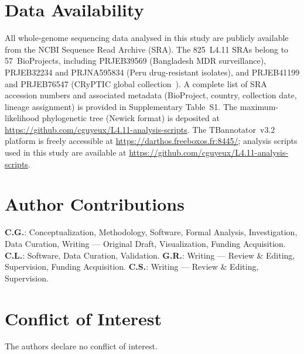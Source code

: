 \documentclass[11pt,a4paper]{article}
\newcommand{\lignee}[1]{\textsf{#1}}
\begin{document}
\section*{Data Availability}

All whole-genome sequencing data analysed in this study are publicly available
from the NCBI Sequence Read Archive (SRA).  The 825~\lignee{L4.11} SRAs
belong to 57~BioProjects, including PRJEB39569 (Bangladesh MDR surveillance),
PRJEB32234 and PRJNA595834 (Peru drug-resistant isolates), and PRJEB41199
and PRJEB76547 (CRyPTIC global collection~\cite{cryptic2022}).  A complete
list of SRA accession numbers and associated
metadata (BioProject, country, collection date, lineage assignment) is provided
in Supplementary Table~S1.
The maximum-likelihood phylogenetic tree (Newick format) is deposited at
\url{https://github.com/cguyeux/L4.11-analysis-scripts}.
The TBannotator~v3.2 platform is freely accessible at
\url{https://darthos.freeboxos.fr:8445/}; analysis scripts used in this
study are available at \url{https://github.com/cguyeux/L4.11-analysis-scripts}.

\section*{Author Contributions}

\textbf{C.G.}: Conceptualization, Methodology, Software, Formal Analysis,
Investigation, Data Curation, Writing --- Original Draft, Visualization,
Funding Acquisition.
\textbf{C.L.}: Software, Data Curation, Validation.
\textbf{G.R.}: Writing --- Review \& Editing, Supervision, Funding Acquisition.
\textbf{C.S.}: Writing --- Review \& Editing, Supervision.

\section*{Conflict of Interest}

The authors declare no conflict of interest.


\end{document}
